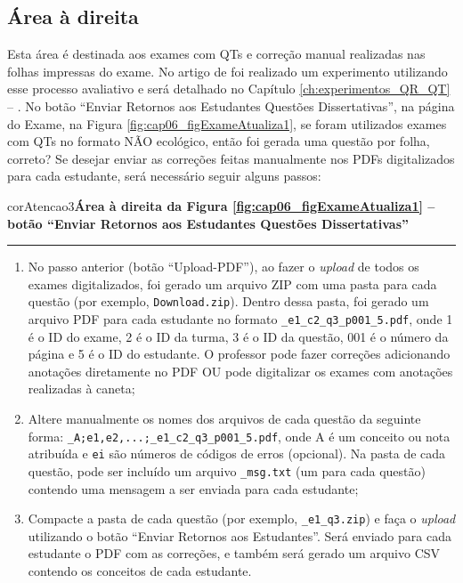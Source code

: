 \subsection{Área à direita}\label{sec:areaDireita}

Esta área é destinada aos exames com QTs e correção manual realizadas nas folhas impressas do exame. No artigo de  foi realizado um experimento utilizando esse processo avaliativo e será detalhado no Capítulo \ref{ch:experimentos_QR_QT} -- . No botão ``Enviar Retornos aos Estudantes Questões Dissertativas'', na página do Exame, na Figura \ref{fig:cap06_figExameAtualiza1}, se foram utilizados exames com QTs no formato NÃO ecológico, então foi gerada uma questão por folha, correto? Se desejar enviar as correções feitas manualmente nos PDFs digitalizados para cada estudante, será necessário seguir alguns passos:

\begin{myboxCode}{corAtencao3}{\textbf{Área à direita da Figura \ref{fig:cap06_figExameAtualiza1} -- botão ``Enviar Retornos aos Estudantes Questões Dissertativas''}}\\\vspace{-3mm}\hrule\vspace{1mm}
{\footnotesize
\begin{enumerate}[itemsep=-1mm]
    \item No passo anterior (botão ``Upload-PDF''), ao fazer o \textit{upload} de todos os exames digitalizados, foi gerado um arquivo ZIP com uma pasta para cada questão (por exemplo, \verb|Download.zip|). Dentro dessa pasta, foi gerado um arquivo PDF para cada estudante no formato \verb|_e1_c2_q3_p001_5.pdf|, onde 1 é o ID do exame, 2 é o ID da turma, 3 é o ID da questão, 001 é o número da página e 5 é o ID do estudante. O professor pode fazer correções adicionando anotações diretamente no PDF OU pode digitalizar os exames com anotações realizadas à caneta;
    \item Altere manualmente os nomes dos arquivos de cada questão da seguinte forma: \verb|_A;e1,e2,...;_e1_c2_q3_p001_5.pdf|, onde A é um conceito ou nota atribuída e \verb|ei| são números de códigos de erros (opcional). Na pasta de cada questão, pode ser incluído um arquivo \verb|_msg.txt| (um para cada questão) contendo uma mensagem a ser enviada para cada estudante;
    \item Compacte a pasta de cada questão (por exemplo, \verb|_e1_q3.zip|) e faça o \textit{upload} utilizando o botão ``Enviar Retornos aos Estudantes''. Será enviado para cada estudante o PDF com as correções, e também será gerado um arquivo CSV contendo os conceitos de cada estudante.
\end{enumerate}
}
\end{myboxCode}


